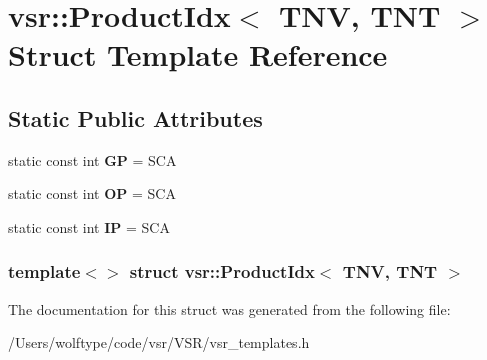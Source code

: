 \hypertarget{structvsr_1_1_product_idx_3_01_t_n_v_00_01_t_n_t_01_4}{\section{vsr\-:\-:Product\-Idx$<$ T\-N\-V, T\-N\-T $>$ Struct Template Reference}
\label{structvsr_1_1_product_idx_3_01_t_n_v_00_01_t_n_t_01_4}
}
\subsection*{Static Public Attributes}
\begin{DoxyCompactItemize}
\item 
\hypertarget{structvsr_1_1_product_idx_3_01_t_n_v_00_01_t_n_t_01_4_a6e41599ed936f45ea582d6ee2eb151fb}{static const int {\bfseries G\-P} = S\-C\-A}\label{structvsr_1_1_product_idx_3_01_t_n_v_00_01_t_n_t_01_4_a6e41599ed936f45ea582d6ee2eb151fb}

\item 
\hypertarget{structvsr_1_1_product_idx_3_01_t_n_v_00_01_t_n_t_01_4_a2fa7ea3e0ca968169428d7935c2a0058}{static const int {\bfseries O\-P} = S\-C\-A}\label{structvsr_1_1_product_idx_3_01_t_n_v_00_01_t_n_t_01_4_a2fa7ea3e0ca968169428d7935c2a0058}

\item 
\hypertarget{structvsr_1_1_product_idx_3_01_t_n_v_00_01_t_n_t_01_4_a5935b69ab944cf8ed58c97db8b581617}{static const int {\bfseries I\-P} = S\-C\-A}\label{structvsr_1_1_product_idx_3_01_t_n_v_00_01_t_n_t_01_4_a5935b69ab944cf8ed58c97db8b581617}

\end{DoxyCompactItemize}
\subsubsection*{template$<$$>$ struct vsr\-::\-Product\-Idx$<$ T\-N\-V, T\-N\-T $>$}



The documentation for this struct was generated from the following file\-:\begin{DoxyCompactItemize}
\item 
/\-Users/wolftype/code/vsr/\-V\-S\-R/vsr\-\_\-templates.\-h\end{DoxyCompactItemize}
